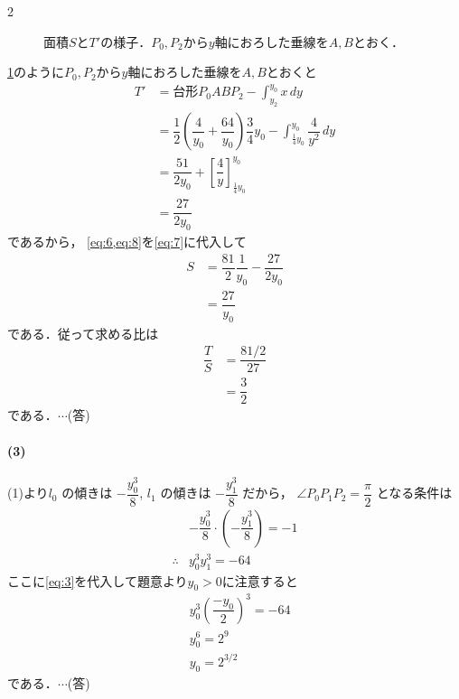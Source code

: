 \documentclass[../../main.tex]{subfiles}
\begin{document}
\begin{multicols}{2}
\begin{figure}[H]
    \caption{面積$S$と$T'$の様子．$P_0, P_2$から$y$軸におろした垂線を$A, B$とおく．}
    \label{2007-1:fig:3}
  \end{figure}

  \cref{2007-1:fig:3}のように$P_0, P_2$から$y$軸におろした垂線を$A, B$とおくと
  \begin{align}
    T'
    & = \text{台形}P_0ABP_2 - \int_{y_2}^{y_0} x \, dy                                                                               \\
    & = \dfrac{1}{2} \left( \dfrac{4}{y_0} + \dfrac{64}{y_0} \right) \dfrac{3}{4}y_0 - \int_{\frac{1}{4}y_0}^{y_0} \dfrac{4}{y^2} \, dy \\
    & = \dfrac{51}{2y_0} + \left[ \dfrac{4}{y} \right]_{\frac{1}{4}y_0}^{y_0}                                                        \\
    & = \dfrac{27}{2y_0} \label{eq:8}
  \end{align}
  であるから，
  \cref{eq:6,eq:8}を\cref{eq:7}に代入して
  \begin{align}
    S
    & =\dfrac{81}{2}\dfrac{1}{y_0} - \dfrac{27}{2y_0} \\
    & =\dfrac{27}{y_0}
  \end{align}
  である．従って求める比は
  \begin{align}
    \dfrac{T}{S}
    & = \dfrac{81/2}{27} \\
    & = \dfrac{3}{2}
  \end{align}
  である．$\cdots$(答)

  \paragraph{(3)}
  (1)より$l_0$ の傾きは $-\dfrac{y^3_0}{8}$, $l_1$ の傾きは $-\dfrac{y^3_{1}}{8}$ だから，
  $\angle P_0 P_1 P_2 = \dfrac{\pi}{2}$ となる条件は
  \begin{align}
    & -\dfrac{y^3_0}{8} \cdot \left(-\dfrac{y^3_{1}}{8}\right) = -1 \\
    \therefore
    & y^3_0y^3_1 = -64
  \end{align}
  ここに\cref{eq:3}を代入して題意より$y_0>0$に注意すると
  \begin{align}
    & y^3_0 \left(\dfrac{-y_0}{2}\right)^3 = -64 \\
    & y^6_0 = 2^9                               \\
    & y_0 = 2^{3/2}
  \end{align}
  である．$\cdots$(答)


\end{multicols}
\end{document}
